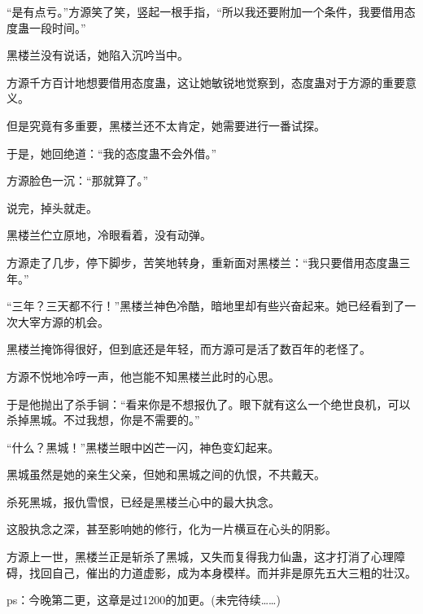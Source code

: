 \begin{this_body}
“是有点亏。”方源笑了笑，竖起一根手指，“所以我还要附加一个条件，我要借用态度蛊一段时间。”

黑楼兰没有说话，她陷入沉吟当中。

方源千方百计地想要借用态度蛊，这让她敏锐地觉察到，态度蛊对于方源的重要意义。

但是究竟有多重要，黑楼兰还不太肯定，她需要进行一番试探。

于是，她回绝道：“我的态度蛊不会外借。”

方源脸色一沉：“那就算了。”

说完，掉头就走。

黑楼兰伫立原地，冷眼看着，没有动弹。

方源走了几步，停下脚步，苦笑地转身，重新面对黑楼兰：“我只要借用态度蛊三年。”

“三年？三天都不行！”黑楼兰神色冷酷，暗地里却有些兴奋起来。她已经看到了一次大宰方源的机会。

黑楼兰掩饰得很好，但到底还是年轻，而方源可是活了数百年的老怪了。

方源不悦地冷哼一声，他岂能不知黑楼兰此时的心思。

于是他抛出了杀手锏：“看来你是不想报仇了。眼下就有这么一个绝世良机，可以杀掉黑城。不过我想，你是不需要的。”

“什么？黑城！”黑楼兰眼中凶芒一闪，神色变幻起来。

黑城虽然是她的亲生父亲，但她和黑城之间的仇恨，不共戴天。

杀死黑城，报仇雪恨，已经是黑楼兰心中的最大执念。

这股执念之深，甚至影响她的修行，化为一片横亘在心头的阴影。

方源上一世，黑楼兰正是斩杀了黑城，又失而复得我力仙蛊，这才打消了心理障碍，找回自己，催出的力道虚影，成为本身模样。而并非是原先五大三粗的壮汉。

ps：今晚第二更，这章是过1200的加更。(未完待续……)

\end{this_body}

